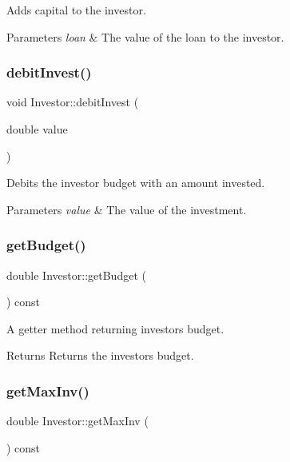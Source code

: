 Adds capital to the investor. 
\begin{DoxyParams}{Parameters}
{\em loan} & The value of the loan to the investor. \\
\hline
\end{DoxyParams}
\mbox{\label{class_investor_a3ea286e2ea7ee73032bb526ad9f65b65}} 
\subsubsection{\texorpdfstring{debit\+Invest()}{debitInvest()}}
{\footnotesize\ttfamily void Investor\+::debit\+Invest (\begin{DoxyParamCaption}\item[{double}]{value }\end{DoxyParamCaption})}

Debits the investor budget with an amount invested. 
\begin{DoxyParams}{Parameters}
{\em value} & The value of the investment. \\
\hline
\end{DoxyParams}
\mbox{\label{class_investor_ab8bd4957a60050ab75c5d7c939c2fc50}} 
\subsubsection{\texorpdfstring{get\+Budget()}{getBudget()}}
{\footnotesize\ttfamily double Investor\+::get\+Budget (\begin{DoxyParamCaption}{ }\end{DoxyParamCaption}) const}

A getter method returning investor\textquotesingle{}s budget. \begin{DoxyReturn}{Returns}
Returns the investor\textquotesingle{}s budget. 
\end{DoxyReturn}
\mbox{\label{class_investor_a2ae3d2c4b2f002cf8a9cdbacb8515f35}} 
\subsubsection{\texorpdfstring{get\+Max\+Inv()}{getMaxInv()}}
{\footnotesize\ttfamily double Investor\+::get\+Max\+Inv (\begin{DoxyParamCaption}{ }\end{DoxyParamCaption}) const}

